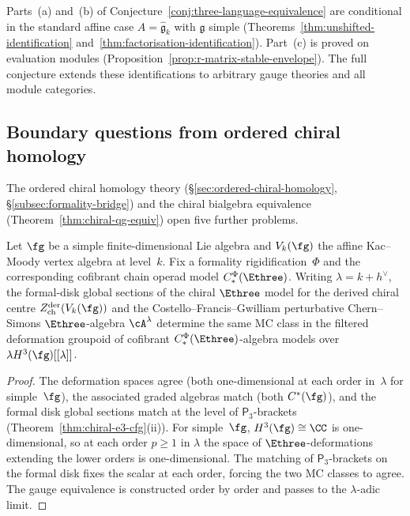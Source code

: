\begin{remark}
Parts~(a) and~(b) of Conjecture~\ref{conj:three-language-equivalence}
are conditional in the standard affine case
$A = \widehat{\mathfrak{g}}_k$ with $\mathfrak{g}$ simple
(Theorems~\ref{thm:unshifted-identification}
and~\ref{thm:factorisation-identification}). Part~(c)
is proved on evaluation modules
(Proposition~\ref{prop:r-matrix-stable-envelope}). The full conjecture
extends these identifications to arbitrary gauge theories and all
module categories.
\end{remark}

\subsection{Boundary questions from ordered chiral homology}
\label{subsec:ordered-ch-hom-open-problems}

The ordered chiral homology theory
(\S\ref{sec:ordered-chiral-homology}, \S\ref{subsec:formality-bridge})
and the chiral bialgebra equivalence
(Theorem~\ref{thm:chiral-qg-equiv}) open five further problems.

\begin{theorem}
\label{thm:e3-identification-km}
\ClaimStatusProvedHere
{}
Let $\fg$ be a simple finite-dimensional Lie algebra and
$V_k(\fg)$ the affine Kac--Moody vertex algebra at level~$k$.
Fix a formality rigidification~$\Phi$ and the corresponding
cofibrant chain operad model $C_*^\Phi(\Ethree)$.  Writing
$\lambda = k + h^\vee$, the formal-disk global sections of the
chiral $\Ethree$ model for the derived chiral centre
$Z^{\mathrm{der}}_{\mathrm{ch}}(V_k(\fg))$ and the
Costello--Francis--Gwilliam perturbative Chern--Simons
$\Ethree$-algebra $\cA^\lambda$ determine the same MC class in the
filtered deformation groupoid of cofibrant
$C_*^\Phi(\Ethree)$-algebra models over
$\lambda H^3(\fg)[[\lambda]]$.
\end{theorem}

\begin{proof}
The deformation spaces agree (both one-dimensional at each order
in~$\lambda$ for simple~$\fg$), the associated graded algebras match
(both $C^*(\fg)$), and the formal disk global sections match at the
level of $\mathsf{P}_3$-brackets
(Theorem~\ref{thm:chiral-e3-cfg}\textup{(ii)}).
For simple~$\fg$, $H^3(\fg) \cong \CC$ is one-dimensional, so at
each order $p \geq 1$ in $\lambda$ the space of
$\Ethree$-deformations extending the lower orders is
one-dimensional. The matching of $\mathsf{P}_3$-brackets on the
formal disk fixes the scalar at each order, forcing the two
MC classes to agree. The gauge equivalence is constructed order by
order and passes to the $\lambda$-adic limit.
\end{proof}

